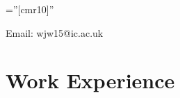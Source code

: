 \documentclass[a4paper,10pt]{article} %
\begin{document}
\pagestyle{empty} %

\font\fb=''[cmr10]'' %


\par{\bigskip\par} %


{\centering
  Email: wjw15@ic.ac.uk\par
}


\section{Work Experience}
\end{document}

